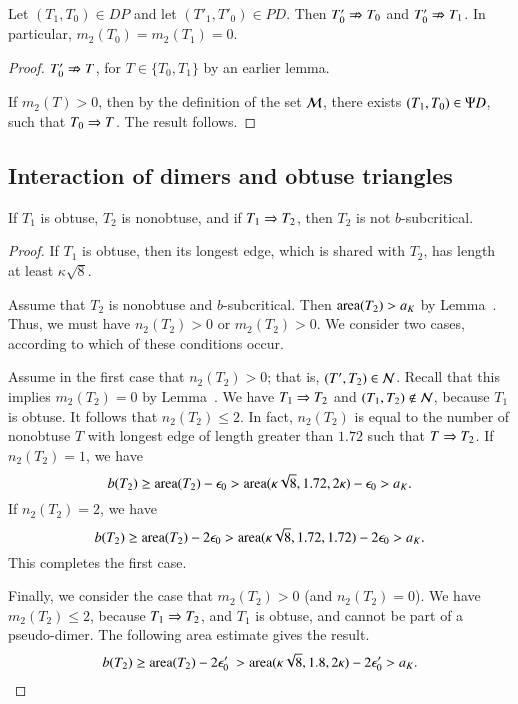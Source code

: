 \begin{lemma}  Let $(T_1,T_0)\in DP$ and let $(T'_1,T'_0)\in PD$.  Then $T'_0\nRightarrow T_0$ and
$T'_0 \nRightarrow T_1$.  In particular, $m_2(T_0)=m_2(T_1)=0$.
\end{lemma}

\begin{proof}  $T'_0\nRightarrow T$, for $T\in\{T_0,T_1\}$ by an earlier lemma.

If $m_2(T)>0$, then by the definition of the set $\mathcal M$,  there exists $(T_1,T_0)\in \Psi D$, such that $T_0\Rightarrow T$.
The result follows.
\end{proof}

\subsection{Interaction of dimers and obtuse triangles}




\begin{lemma}
  If $T_1$ is obtuse, $T_2$ is nonobtuse, and if $T_1 \Rightarrow T_2$, then $T_2$ is not
  $b$-subcritical.
\end{lemma}


\begin{proof} 
  If $T_1$ is obtuse, then its longest edge, which is shared with
  $T_2$, has length at least $\kappa\sqrt8$.

  Assume that $T_2$ is nonobtuse and $b$-subcritical.  Then ${\operatorname{area}}(T_2) > a_K$ by
  Lemma~.  Thus, we must have $n_2(T_2)>0$ or $m_2(T_2)>0$.
  We consider two cases, according to which of these conditions occur.

 Assume in the first case that $n_2(T_2)>0$; that is, $(T',T_2)\in \mathcal N$.  Recall that this
 implies $m_2(T_2)=0$ by Lemma~.
  We have $T_1\Rightarrow T_2$ and $(T_1,T_2)\not\in \mathcal N$, because $T_1$ is obtuse.  
  It follows that $n_2(T_2)\le 2$.  In fact, $n_2(T_2)$ is equal to the number of
  nonobtuse $T$ with longest edge of length greater than $1.72$ such that $T\Rightarrow T_2$.
  If $n_2(T_2)=1$, we have
  \[
b(T_2) \ge {\operatorname{area}}(T_2) - \epsilon_0 > {\operatorname{area}}(\kappa\sqrt8,1.72,2\kappa)  - \epsilon_0 > a_K.
\]
If $n_2(T_2)=2$, we have
  \[
b(T_2) \ge {\operatorname{area}}(T_2) - 2\epsilon_0 > {\operatorname{area}}(\kappa\sqrt8,1.72,1.72)  - 2\epsilon_0 > a_K.
\]
  This completes the first case.

  Finally, we consider the case that $m_2(T_2)>0$ (and $n_2(T_2)=0$).
  We have $m_2(T_2)\le 2$, because $T_1\Rightarrow T_2$, and $T_1$ is obtuse, and cannot be
part of a pseudo-dimer.
  The following area estimate gives the result.
  \[
b(T_2) \ge {\operatorname{area}}(T_2) - 2\epsilon_0'\ > {\operatorname{area}}(\kappa\sqrt8,1.8,2\kappa)  - 2\epsilon_0' > a_K.
\]
\end{proof}

